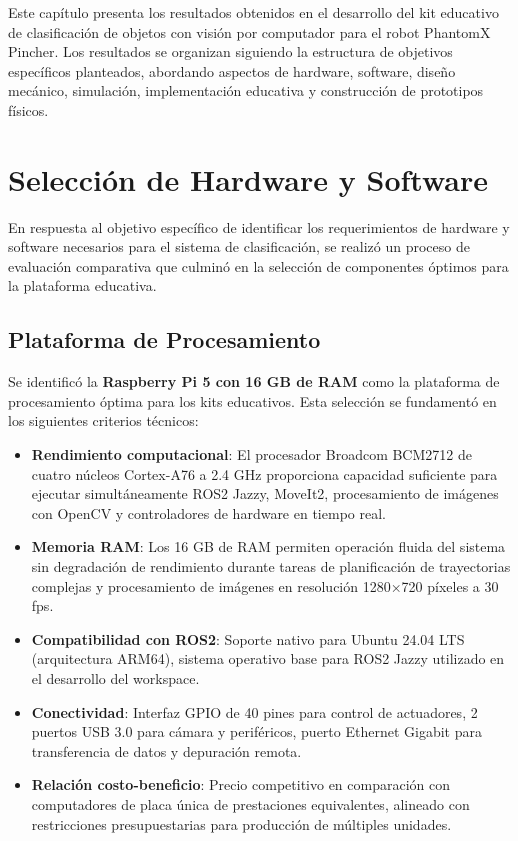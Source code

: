 Este capítulo presenta los resultados obtenidos en el desarrollo del kit educativo de clasificación de objetos con visión por computador para el robot PhantomX Pincher. Los resultados se organizan siguiendo la estructura de objetivos específicos planteados, abordando aspectos de hardware, software, diseño mecánico, simulación, implementación educativa y construcción de prototipos físicos.

\section{Selección de Hardware y Software}

En respuesta al objetivo específico de identificar los requerimientos de hardware y software necesarios para el sistema de clasificación, se realizó un proceso de evaluación comparativa que culminó en la selección de componentes óptimos para la plataforma educativa.

\subsection{Plataforma de Procesamiento}

Se identificó la \textbf{Raspberry Pi 5 con 16 GB de RAM} como la plataforma de procesamiento óptima para los kits educativos. Esta selección se fundamentó en los siguientes criterios técnicos:

\begin{itemize}
    \item \textbf{Rendimiento computacional}: El procesador Broadcom BCM2712 de cuatro núcleos Cortex-A76 a 2.4 GHz proporciona capacidad suficiente para ejecutar simultáneamente ROS2 Jazzy, MoveIt2, procesamiento de imágenes con OpenCV y controladores de hardware en tiempo real.
    
    \item \textbf{Memoria RAM}: Los 16 GB de RAM permiten operación fluida del sistema sin degradación de rendimiento durante tareas de planificación de trayectorias complejas y procesamiento de imágenes en resolución 1280×720 píxeles a 30 fps.
    
    \item \textbf{Compatibilidad con ROS2}: Soporte nativo para Ubuntu 24.04 LTS (arquitectura ARM64), sistema operativo base para ROS2 Jazzy utilizado en el desarrollo del workspace.
    
    \item \textbf{Conectividad}: Interfaz GPIO de 40 pines para control de actuadores, 2 puertos USB 3.0 para cámara y periféricos, puerto Ethernet Gigabit para transferencia de datos y depuración remota.
    
    \item \textbf{Relación costo-beneficio}: Precio competitivo en comparación con computadores de placa única de prestaciones equivalentes, alineado con restricciones presupuestarias para producción de múltiples unidades.
\end{itemize}

